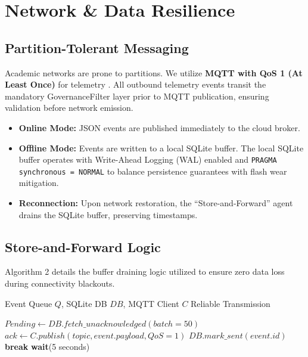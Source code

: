 \documentclass[conference]{IEEEtran}
\begin{document}
\section{Network \& Data Resilience}

\subsection{Partition-Tolerant Messaging}
Academic networks are prone to partitions. We utilize \textbf{MQTT with QoS 1 (At Least Once)} for telemetry \cite{b16}. All outbound telemetry events transit the mandatory GovernanceFilter layer prior to MQTT publication, ensuring validation before network emission.
\begin{itemize}
    \item \textbf{Online Mode:} JSON events are published immediately to the cloud broker.
    \item \textbf{Offline Mode:} Events are written to a local SQLite buffer. The local SQLite buffer operates with Write-Ahead Logging (WAL) enabled and \texttt{PRAGMA synchronous = NORMAL} to balance persistence guarantees with flash wear mitigation.
    \item \textbf{Reconnection:} Upon network restoration, the ``Store-and-Forward'' agent drains the SQLite buffer, preserving timestamps.
\end{itemize}

\subsection{Store-and-Forward Logic}
Algorithm 2 details the buffer draining logic utilized to ensure zero data loss during connectivity blackouts.

\begin{algorithm}
\caption{MQTT Store-and-Forward Agent}
\begin{algorithmic}[1]
\REQUIRE Event Queue $Q$, SQLite DB $DB$, MQTT Client $C$
\ENSURE Reliable Transmission

        \STATE $Pending \leftarrow DB.fetch\_unacknowledged(batch=50)$
            \STATE $ack \leftarrow C.publish(topic, event.payload, QoS=1)$
                \STATE $DB.mark\_sent(event.id)$
            \ELSE
                \STATE \textbf{break} 
            \ENDIF
        \ENDFOR
    \ELSE
        \STATE \textbf{wait}(5 seconds) 
    \ENDIF
\ENDWHILE
\end{algorithmic}
\end{algorithm}
\end{document}
